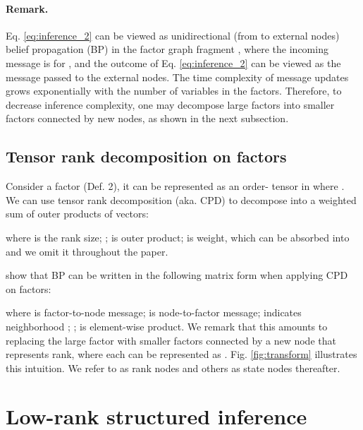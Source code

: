 \documentclass[11pt]{article}
\begin{document}
\paragraph{Remark.} Eq. \ref{eq:inference_2} can be viewed as unidirectional (from  to external nodes) belief propagation (BP) in the factor graph fragment , where the incoming message is  for , and the outcome of Eq. \ref{eq:inference_2} can be viewed as the message passed to the external nodes. The time complexity of message updates grows exponentially with the number of variables in the factors. Therefore, to decrease inference complexity, one may decompose large factors into smaller factors connected by new nodes, 
as shown in the next subsection.

\subsection{Tensor rank decomposition on factors}
Consider a factor  (Def. 2), it can be represented as an order- tensor in  where . We can use tensor rank decomposition (aka. CPD) to decompose  into a weighted sum of outer products of vectors:

where  is the rank size; ;  is outer product;   is weight, which can be absorbed into  and we omit it throughout the paper.

 \citet[][]{DBLP:journals/corr/abs-2010-09283} show that BP can be written in the following matrix form when applying CPD on factors:

where  is factor-to-node message;  is node-to-factor message;  indicates neighborhood ;  ;  is  element-wise product. We remark that this amounts to replacing the large factor  with smaller factors  connected by a new node  that represents rank, where each  can be represented as . Fig. \ref{fig:transform} illustrates this intuition. We refer to  as rank nodes and others as state nodes thereafter.

\section{Low-rank structured inference}
\label{sec: low-rank}
\end{document}
